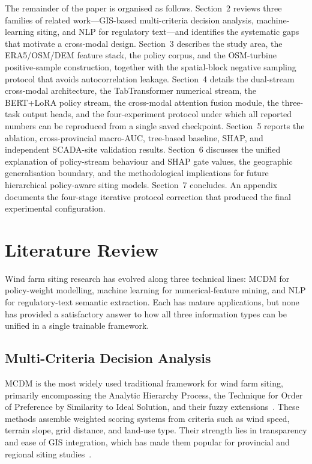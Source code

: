 \documentclass[12pt, a4paper]{article}
\begin{document}
The remainder of the paper is organised as follows.
Section~2 reviews three families of related work---GIS-based
multi-criteria decision analysis, machine-learning siting, and
NLP for regulatory text---and identifies the systematic gaps
that motivate a cross-modal design. Section~3 describes the
study area, the ERA5/OSM/DEM feature stack, the policy corpus,
and the OSM-turbine positive-sample construction, together with
the spatial-block negative sampling protocol that avoids
autocorrelation leakage. Section~4 details the dual-stream
cross-modal architecture, the TabTransformer numerical stream,
the BERT+LoRA policy stream, the cross-modal attention fusion
module, the three-task output heads, and the four-experiment
protocol under which all reported numbers can be reproduced
from a single saved checkpoint. Section~5 reports the
ablation, cross-provincial macro-AUC, tree-based baseline,
SHAP, and independent SCADA-site validation results.
Section~6 discusses the unified explanation of policy-stream
behaviour and SHAP gate values, the geographic generalisation
boundary, and the methodological implications for future
hierarchical policy-aware siting models. Section~7 concludes.
An appendix documents the four-stage iterative protocol
correction that produced the final experimental
configuration.

\section{Literature Review}

Wind farm siting research has evolved along three technical
lines: MCDM for policy-weight modelling, machine learning for
numerical-feature mining, and NLP for regulatory-text semantic
extraction. Each has mature applications, but none has provided
a satisfactory answer to how all three information types can be
unified in a single trainable framework.

\subsection{Multi-Criteria Decision Analysis}

MCDM is the most widely used traditional framework for wind
farm siting, primarily encompassing the Analytic Hierarchy
Process, the Technique for Order of Preference by Similarity
to Ideal Solution, and their fuzzy extensions~\cite{xu2020,wu2022}.
These methods assemble weighted scoring systems from criteria
such as wind speed, terrain slope, grid distance, and land-use
type. Their strength lies in transparency and ease of GIS
integration, which has made them popular for provincial and
regional siting studies~\cite{tercan2020aegean}.
\end{document}
